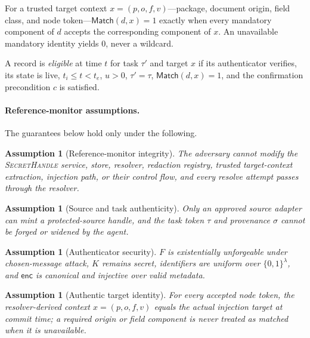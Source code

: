 \documentclass[sigconf,10pt]{acmart}
\newcommand{\SH}{\textsc{SecretHandle}}
\newcommand{\Match}{\ensuremath{\mathsf{Match}}}
\newcommand{\bits}{\{0,1\}}
\newcommand{\enc}{\ensuremath{\mathsf{enc}}}
\theoremstyle{acmplain}%
\newtheorem{assumption}[theorem]{Assumption}%
\begin{document}
\begin{definition}
\label{def:match}
For a trusted target context $x=(p,o,f,v)$---package, document origin, field class, and node token---$\Match(d,x)=1$ exactly when every mandatory component of $d$ accepts the corresponding component of $x$. An unavailable mandatory identity yields $0$, never a wildcard.
\end{definition}

\begin{definition}
\label{def:elig}
A record is \emph{eligible} at time $t$ for task $\tau'$ and target $x$ if its authenticator verifies, its state is live, $t_i\le t<t_e$, $u>0$, $\tau'=\tau$, $\Match(d,x)=1$, and the confirmation precondition $c$ is satisfied.
\end{definition}

\paragraph{Reference-monitor assumptions.} The guarantees below hold only under the following.

\begin{assumption}[Reference-monitor integrity]
\label{ass:tcb}
The adversary cannot modify the \SH{} service, store, resolver, redaction registry, trusted target-context extraction, injection path, or their control flow, and every resolve attempt passes through the resolver.
\end{assumption}

\begin{assumption}[Source and task authenticity]
\label{ass:source}
Only an approved source adapter can mint a protected-source handle, and the task token $\tau$ and provenance $\sigma$ cannot be forged or widened by the agent.
\end{assumption}

\begin{assumption}[Authenticator security]
\label{ass:crypto}
$F$ is existentially unforgeable under chosen-message attack, $K$ remains secret, identifiers are uniform over $\bits^\lambda$, and $\enc$ is canonical and injective over valid metadata.
\end{assumption}

\begin{assumption}[Authentic target identity]
\label{ass:identity}
For every accepted node token, the resolver-derived context $x=(p,o,f,v)$ equals the actual injection target at commit time; a required origin or field component is never treated as matched when it is unavailable.
\end{assumption}
\end{document}
